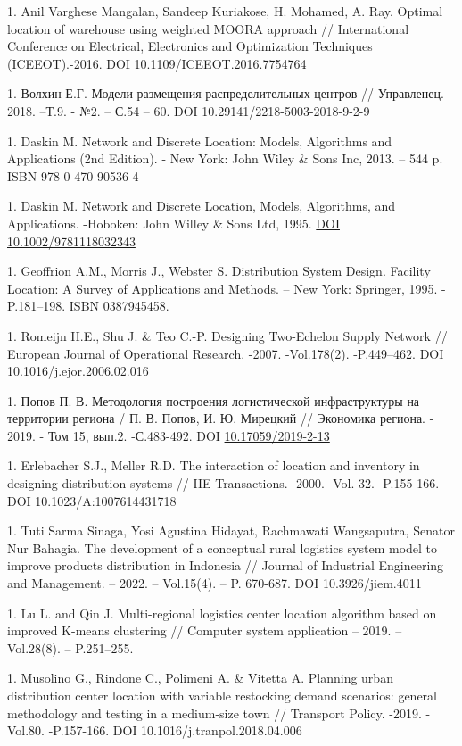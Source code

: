 1. Anil Varghese Mangalan, Sandeep Kuriakose, H. Mohamed, A. Ray. Optimal
location of warehouse using weighted MOORA approach // International
Conference on Electrical, Electronics and Optimization Techniques
(ICEEOT).-2016. DOI 10.1109/ICEEOT.2016.7754764

1. Волхин Е.Г. Модели размещения распределительных центров // Управленец.
- 2018. --Т.9. - №2. -- С.54 -- 60. DOI 10.29141/2218-5003-2018-9-2-9

1. Daskin M. Network and Discrete Location: Models, Algorithms and
Applications (2nd Edition). - New York: John Wiley \& Sons Inc, 2013.
-- 544 p. ISBN 978-0-470-90536-4

1. Daskin M. Network and Discrete Location, Models, Algorithms, and
Applications. -Hoboken: John Willey \& Sons Ltd, 1995.
\href{http://dx.doi.org/10.1002/9781118032343}{DOI
10.1002/9781118032343}

1. Geoffrion A.M., Morris J., Webster S. Distribution System Design.
Facility Location: A Survey of Applications and Methods. -- New York:
Springer, 1995. -P.181--198. ISBN 0387945458.

1. Romeijn H.E., Shu J. \& Teo C.-P. Designing Two-Echelon Supply Network
// European Journal of Operational Research. -2007. -Vol.178(2).
-P.449--462.
DOI 10.1016/j.ejor.2006.02.016

\setcounter{enumi}{11}

1. Попов П. В. Методология построения логистической инфраструктуры на
территории региона / П. В. Попов, И. Ю. Мирецкий // Экономика региона.
- 2019. - Том 15, вып.2. -С.483-492. DOI
\href{http://dx.doi.org/10.17059/2019-2-13}{10.17059/2019-2-13}

1. Erlebacher S.J., Meller R.D. The interaction of location and inventory
in designing distribution systems // IIE Transactions. -2000. -Vol.
32. -P.155-166. DOI 10.1023/A:1007614431718

1. Tuti Sarma Sinaga, Yosi Agustina Hidayat, Rachmawati Wangsaputra,
Senator Nur Bahagia. The development of a conceptual rural logistics
system model to improve products distribution in Indonesia // Journal
of Industrial Engineering and Management. -- 2022. -- Vol.15(4). -- P.
670-687. DOI 10.3926/jiem.4011

1. Lu L. and Qin J. Multi-regional logistics center location algorithm
based on improved K-means clustering // Computer system application --
2019. -- Vol.28(8). -- P.251--255.

1. Musolino G., Rindone C., Polimeni A. \& Vitetta A. Planning urban
distribution center location with variable restocking demand
scenarios: general methodology and testing in a medium-size town //
Transport Policy. -2019. -Vol.80. -P.157-166. DOI
10.1016/j.tranpol.2018.04.006

